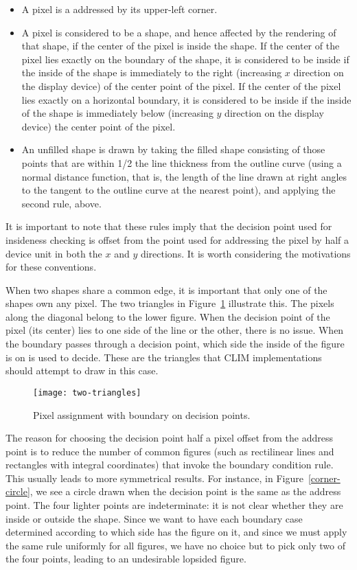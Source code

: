 \begin{itemize}
\item A pixel is a addressed by its upper-left corner.

\item A pixel is considered to be  a shape, and hence affected
by the rendering of that shape, if the center of the pixel is inside the shape.
If the center of the pixel lies exactly on the boundary of the shape, it is
considered to be inside if the inside of the shape is immediately to the right
(increasing $x$ direction on the display device) of the center point of the
pixel.  If the center of the pixel lies exactly on a horizontal boundary, it is
considered to be inside if the inside of the shape is immediately below
(increasing $y$ direction on the display device) the center point of the pixel.

\item An unfilled shape is drawn by taking the filled shape consisting of those
points that are within 1/2 the line thickness from the outline curve (using a
normal distance function, that is, the length of the line drawn at right angles
to the tangent to the outline curve at the nearest point), and applying the
second rule, above.
\end{itemize}

It is important to note that these rules imply that the decision point used for
insideness checking is offset from the point used for addressing the pixel by
half a device unit in both the $x$ and $y$ directions.  It is worth considering
the motivations for these conventions.

When two shapes share a common edge, it is important that only one of the shapes
own any pixel.  The two triangles in Figure~\ref{two-triangles} illustrate this.
The pixels along the diagonal belong to the lower figure.  When the decision
point of the pixel (its center) lies to one side of the line or the other, there
is no issue.  When the boundary passes through a decision point, which side the
inside of the figure is on is used to decide.  These are the triangles that CLIM
implementations should attempt to draw in this case.

\begin{figure}
\centerline{\texttt{[image: two-triangles]}}
\caption{\label{two-triangles} Pixel assignment with boundary on decision points.}
\end{figure}

The reason for choosing the decision point half a pixel offset from the address
point is to reduce the number of common figures (such as rectilinear lines and
rectangles with integral coordinates) that invoke the boundary condition rule.
This usually leads to more symmetrical results.  For instance, in
Figure~\ref{corner-circle}, we see a circle drawn when the decision point is the
same as the address point.  The four lighter points are indeterminate: it is not
clear whether they are inside or outside the shape.  Since we want to have each
boundary case determined according to which side has the figure on it, and since
we must apply the same rule uniformly for all figures, we have no choice but to
pick only two of the four points, leading to an undesirable lopsided figure.


